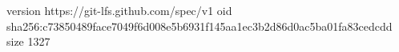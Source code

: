 version https://git-lfs.github.com/spec/v1
oid sha256:c73850489face7049f6d008e5b6931f145aa1ec3b2d86d0ac5ba01fa83cedcdd
size 1327
